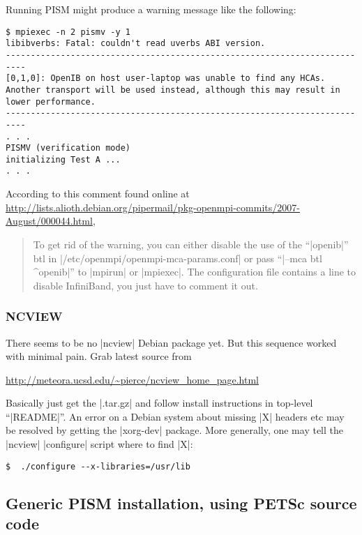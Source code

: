 \documentclass[11pt,final]{amsart}
\begin{document}
Running PISM might produce a warning message like the following:
\begin{verbatim}
$ mpiexec -n 2 pismv -y 1
libibverbs: Fatal: couldn't read uverbs ABI version.
--------------------------------------------------------------------------
[0,1,0]: OpenIB on host user-laptop was unable to find any HCAs.
Another transport will be used instead, although this may result in 
lower performance.
--------------------------------------------------------------------------
. . .
PISMV (verification mode)
initializing Test A ...
. . .
\end{verbatim}
According to this comment found online at \url{http://lists.alioth.debian.org/pipermail/pkg-openmpi-commits/2007-August/000044.html},
\begin{quote}
   To get rid of the warning, you can either disable the use of the ``|openib|'' btl
   in |/etc/openmpi/openmpi-mca-params.conf| or pass ``|--mca btl ^openib|'' to |mpirun|
   or |mpiexec|.  The configuration file contains a line to disable InfiniBand, you
   just have to comment it out.
\end{quote}
\bigskip

\subsubsection*{NCVIEW}  There seems to be no |ncview| Debian package
yet.  But this sequence worked with minimal pain.  Grab latest source from
\begin{center}
  \url{http://meteora.ucsd.edu/~pierce/ncview_home_page.html}
\end{center}
Basically just get the |.tar.gz| and follow install instructions in top-level ``|README|''.  An error on a Debian system about missing |X| headers etc may be resolved by getting the |xorg-dev| package.  More generally, one may tell the |ncview| |configure| script where to find |X|:
\begin{verbatim}
$  ./configure --x-libraries=/usr/lib
\end{verbatim}

\clearpage
\subsection{Generic PISM installation, using PETSc source code}\label{subsec:generic}
\end{document}

